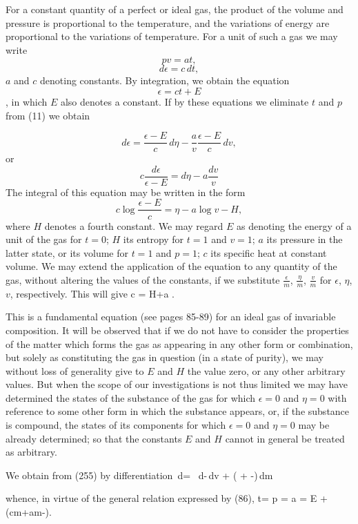 \documentclass[12pt]{memoir}
\begin{document}
For a constant quantity of a perfect or ideal gas, the product of the volume and pressure is proportional to the temperature, and the variations of energy are proportional to the variations of temperature. For a unit of such a gas we may write
$$pv = at,$$
$$d\epsilon = c\,dt,$$
$a$ and $c$ denoting constants. By integration, we obtain the equation
$$\epsilon = ct+E$$,
in which $E$ also denotes a constant. If by these equations we eliminate $t$ and $p$ from (11) we obtain

$$d \epsilon = \frac{\epsilon -E}{c}\,d\eta-\frac{a}{v}\frac{\epsilon -E}{c}\,dv,$$
or   $$  c\frac{d\epsilon}{\epsilon-E}=d\eta -a\frac{dv}{v} $$
The integral of this equation may be written in the form
$$c \log \frac{\epsilon -E}{c} = \eta -a \log v - H,$$
where $H$ denotes a fourth constant. We may regard $E$ as denoting the energy of a unit of the gas for $t=0$; $H$ its entropy for $t= 1$ and $v= 1$; $a$ its pressure in the latter state, or its volume for $t =1$ and $p= 1$; $c$ its specific heat at constant volume. We may extend the application of the equation to any quantity of the gas, without altering the values of the constants, if we substitute $\frac{\epsilon}{m}$, $\frac{\eta}{m}$, $\frac{v}{m}$ for $\epsilon$, $\eta$, $v$, respectively. This will give
\eqs c \log {}= H+a \log{} . \label{255}\eqe

This is a fundamental equation (see pages 85-89) for an ideal gas of invariable composition. It will be observed that if we do not have to consider the properties of the matter which forms the gas as appearing in any other form or combination, but solely as constituting the gas in question (in a state of purity), we may without loss of generality give to $E$ and $H$ the value zero, or any other arbitrary values. But when the scope of our investigations is not thus limited we may have determined the states of the substance of the gas for which $\epsilon=0$ and $\eta = 0$ with reference to some other form in which the substance appears, or, if the substance is compound, the states of its components for which $\epsilon=0$ and $\eta = 0$ may be already determined; so that the constants $E$ and $H$ cannot in general be treated as arbitrary.


We obtain from (255) by differentiation
\eqs
{}\,d\epsilon=  \, d\eta -\,dv +
\left( + -\right)\,dm
\label{256}\eqe

whence, in virtue of the general relation expressed by (86),
\eqs t=\label{257}\eqe
\eqs p = a    \label{258}\eqe
\eqs  \mu = E +  (cm+am-\eta).   \label{259}\eqe
\end{document}
